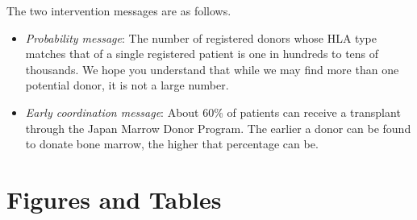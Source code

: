 \documentclass[12pt, a4paper]{article}
\providecommand{\tightlist}{%
  \setlength{\itemsep}{0pt}\setlength{\parskip}{0pt}}
\begin{document}
The two intervention messages are as follows.

\begin{itemize}
\tightlist
\item
  \emph{Probability message}: The number of registered donors whose HLA type matches that of a single registered patient is one in hundreds to tens of thousands. We hope you understand that while we may find more than one potential donor, it is not a large number.
\item
  \emph{Early coordination message}: About 60\% of patients can receive a transplant through the Japan Marrow Donor Program. The earlier a donor can be found to donate bone marrow, the higher that percentage can be.
\end{itemize}

\setcounter{figure}{0}
\setcounter{table}{0}
\renewcommand\thefigure{\thesection\arabic{figure}}
\renewcommand{\thetable}{\thesection\arabic{table}}
\renewcommand{\theHfigure}{\thesection\arabic{figure}}
\renewcommand{\theHtable}{\thesection\arabic{table}}

\hypertarget{figtab}{%
\section{Figures and Tables}\label{figtab}}
\end{document}
